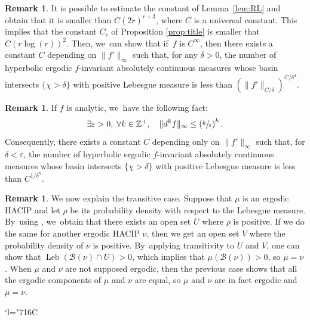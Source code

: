 \documentclass[JEP,XML,SOM,Unicode,NoFloatCountersInSection,published]{cedram}
\newcommand{\Changelback}{\mathcode`l="716C}
\DeclareMathOperator{\Leb}{Leb}
\let\rC C
\theoremstyle{definition}
\newtheorem{rmq}[thm]{Remark}
\newcommand{\bbZ}{{\mathbb{Z}}}
\begin{document}
\begin{rmq}
It is possible to estimate the constant of Lemma~\ref{lem:RL} and obtain that it is smaller than $C (2r)^{r+3}$, where $C$ is a universal constant. This implies that the constant $C_r$ of Proposition \ref{prop:title} is smaller that $C (r \log(r))^2$. Then, we~can show that if~$f$ is $\rC^{\infty}$, then there exists a constant $C$ depending on $\| f' \|_{\infty}$ such that, for any $\delta > 0$, the number of hyperbolic ergodic $f$\nobreakdash-invariant absolutely continuous measures whose basin intersects $\{ \chi > \delta \}$ with positive Lebesgue measure is less than
$
\left (\| f' \|_{C/\delta} \right)^{C / \delta^4}
$.
\end{rmq}

\begin{rmq}
\label{rmq:analytic}
If $f$ is analytic, we~have the following fact:
\[
\exists \varepsilon > 0,\; \forall k \in \bbZ^+,\quad \| d^k f\|_{\infty} \leq \left (\sfrac{k}{\varepsilon} \right)^k.
\]
Consequently, there exists a constant $C$ depending only on $\| f' \|_{\infty}$ such that, for $\delta < \varepsilon$, the number of hyperbolic ergodic $f$\nobreakdash-invariant absolutely continuous measures whose basin intersects $\{ \chi > \delta \}$ with positive Lebesgue measure is less than
$
C^{1 / \delta^5}
$.
\end{rmq}

\begin{rmq}
\label{rmq:trans}
We now explain the transitive case. Suppose that $\mu$ is an ergodic HACIP and let $\rho$ be its probability density with respect to the Lebesgue measure. By~using \cite[Lem.\,VII.9.1]{SETE}, we~obtain that there exists an open set $U$ where $\rho$ is positive.
If we do the same for another ergodic HACIP $\nu$, then we get an open set $V$ where the probability density of $\nu$ is positive. By~applying transitivity to $U$ and $V$, one can show that $\Leb(\mathcal{B}(\nu) \cap U) > 0$, which implies that $\mu(\mathcal{B}(\nu)) > 0$, so $\mu=\nu$.
When $\mu$ and $\nu$ are not supposed ergodic, then the previous case shows that all the ergodic components of $\mu$ and $\nu$ are equal, so $\mu$ and $\nu$ are in fact ergodic and $\mu=\nu$.
\end{rmq}


\newpage
\backmatter
\smaller\smaller
\renewcommand{\glossaryname}{Index of notations}
\printglossary[title={Index of notations}]
\Changelback
\larger\larger
\clearpage
\renewcommand{\glossaryname}{References}


\end{document}
